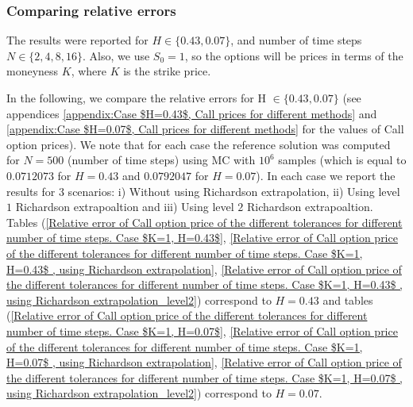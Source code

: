 \documentclass[11pt]{article}
\begin{document}
\newpage
\subsubsection{Comparing relative errors}\label{sec:Comparing relative errors}

The results were reported for $H \in \{0.43,0.07\}$, and number of time steps $N \in \{2,4,8,16\}$.  Also, we use $S_0=1$, so the options will be prices in terms of the moneyness $K$, where $K$ is the strike price.  


In the following, we compare the  relative errors for H $\in \{0.43,0.07\}$ (see appendices \ref{appendix:Case $H=0.43$, Call prices for different methods} and \ref{appendix:Case $H=0.07$, Call prices for different methods} for the values of Call option prices). We note that for each case the reference solution was computed for $N=500$ (number of time steps) using MC with $10^6$ samples (which is equal to  $0.0712073$ for $H=0.43$ and  $0.0792047$ for $H=0.07$). In each case  we report the results for 3 scenarios: i) Without using Richardson extrapolation, ii) Using level $1$ Richardson extrapoaltion and  iii) Using level $2$ Richardson extrapoaltion. Tables (\ref{Relative error of Call option price of the different tolerances for different number of time steps. Case $K=1, H=0.43$}, \ref{Relative error of Call option price of the different tolerances for different number of time steps. Case $K=1, H=0.43$ , using Richardson extrapolation}, \ref{Relative error of Call option price of the different tolerances for different number of time steps. Case $K=1, H=0.43$ , using Richardson extrapolation_level2})  correspond to $H=0.43$ and tables (\ref{Relative error of Call option price of the different tolerances for different number of time steps. Case $K=1, H=0.07$}, \ref{Relative error of Call option price of the different tolerances for different number of time steps. Case $K=1, H=0.07$ , using Richardson extrapolation}, \ref{Relative error of Call option price of the different tolerances for different number of time steps. Case $K=1, H=0.07$ , using Richardson extrapolation_level2})  correspond to $H=0.07$.
\end{document}
